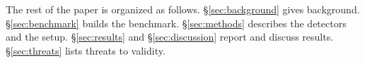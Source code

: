 The rest of the paper is organized as follows.
\S\ref{sec:background} gives background.
\S\ref{sec:benchmark} builds the benchmark.
\S\ref{sec:methods} describes the detectors and the setup.
\S\ref{sec:results} and \S\ref{sec:discussion} report and discuss results.
\S\ref{sec:threats} lists threats to validity.
